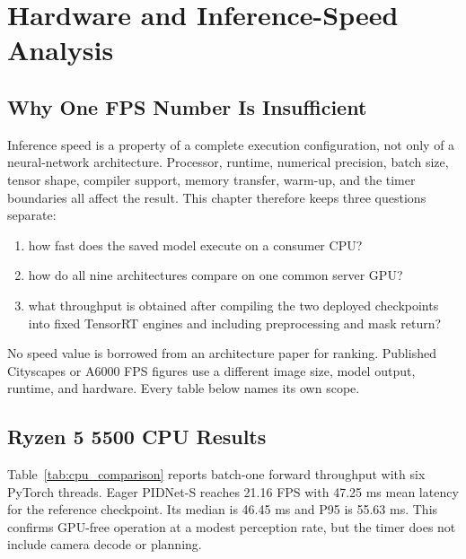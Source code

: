 \chapter{Hardware and Inference-Speed Analysis}
\label{ch:hardware}

\section{Why One FPS Number Is Insufficient}

Inference speed is a property of a complete execution configuration, not only
of a neural-network architecture. Processor, runtime, numerical precision,
batch size, tensor shape, compiler support, memory transfer, warm-up, and the
timer boundaries all affect the result. This chapter therefore keeps three
questions separate:
\begin{enumerate}
  \item how fast does the saved model execute on a consumer CPU?
  \item how do all nine architectures compare on one common server GPU?
  \item what throughput is obtained after compiling the two deployed
  checkpoints into fixed TensorRT engines and including preprocessing and mask
  return?
\end{enumerate}

No speed value is borrowed from an architecture paper for ranking. Published
Cityscapes or A6000 FPS figures use a different image size, model output, runtime, and
hardware. Every table below names its own scope.

\section{Ryzen 5 5500 CPU Results}

Table~\ref{tab:cpu_comparison} reports batch-one forward throughput with six
PyTorch threads. Eager PIDNet-S reaches 21.16 FPS with 47.25 ms mean latency
for the reference checkpoint. Its median is 46.45 ms and P95 is 55.63 ms.
This confirms GPU-free operation at a modest perception rate, but the timer
does not include camera decode or planning.

